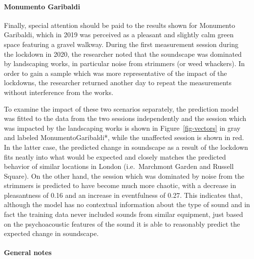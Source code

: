 \documentclass[
  authoryear,
  preprint,
  3p,
  onecolumn]{elsarticle}
\let\oldparagraph\paragraph
\renewcommand{\paragraph}[1]{\oldparagraph{#1}\mbox{}}
\begin{document}
\paragraph{Monumento Garibaldi}\label{monumento-garibaldi}

Finally, special attention should be paid to the results shown for
Monumento Garibaldi, which in 2019 was perceived as a pleasant and
slightly calm green space featuring a gravel walkway. During the first
measurement session during the lockdown in 2020, the researcher noted
that the soundscape was dominated by landscaping works, in particular
noise from strimmers (or weed whackers). In order to gain a sample which
was more representative of the impact of the lockdowns, the researcher
returned another day to repeat the measurements without interference
from the works.

To examine the impact of these two scenarios separately, the prediction
model was fitted to the data from the two sessions independently and the
session which was impacted by the landscaping works is shown in
Figure~\ref{fig-vectors} in gray and labeled MonumentoGaribaldi*, while
the unaffected session is shown in red. In the latter case, the
predicted change in soundscape as a result of the lockdown fits neatly
into what would be expected and closely matches the predicted behavior
of similar locations in London (i.e.~Marchmont Garden and Russell
Square). On the other hand, the session which was dominated by noise
from the strimmers is predicted to have become much more chaotic, with a
decrease in pleasantness of 0.16 and an increase in eventfulness of
0.27. This indicates that, although the model has no contextual
information about the type of sound and in fact the training data never
included sounds from similar equipment, just based on the psychoacoustic
features of the sound it is able to reasonably predict the expected
change in soundscape.

\paragraph{General notes}\label{general-notes}
\end{document}
